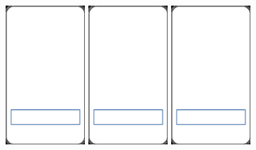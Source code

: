 \documentclass[a4paper]{article}
\begin{document}
	\includegraphics[width=3.0cm]{img-9_3}
	\includegraphics[width=3.0cm]{img-9_4}
	\includegraphics[width=3.0cm]{img-9_5}
\end{document}
